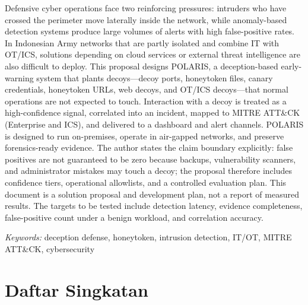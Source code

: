 \documentclass[12pt,a4paper]{article}
\begin{document}
Defensive cyber operations face two reinforcing pressures: intruders who have crossed the perimeter move laterally inside the network, while anomaly-based detection systems produce large volumes of alerts with high false-positive rates. In Indonesian Army networks that are partly isolated and combine IT with OT/ICS, solutions depending on cloud services or external threat intelligence are also difficult to deploy. This proposal designs POLARIS, a deception-based early-warning system that plants decoys---decoy ports, honeytoken files, canary credentials, honeytoken URLs, web decoys, and OT/ICS decoys---that normal operations are not expected to touch. Interaction with a decoy is treated as a high-confidence signal, correlated into an incident, mapped to MITRE ATT\&CK (Enterprise and ICS), and delivered to a dashboard and alert channels. POLARIS is designed to run on-premises, operate in air-gapped networks, and preserve forensics-ready evidence. The author states the claim boundary explicitly: false positives are not guaranteed to be zero because backups, vulnerability scanners, and administrator mistakes may touch a decoy; the proposal therefore includes confidence tiers, operational allowlists, and a controlled evaluation plan. This document is a solution proposal and development plan, not a report of measured results. The targets to be tested include detection latency, evidence completeness, false-positive count under a benign workload, and correlation accuracy.

\vspace{0.3cm}
\noindent\textit{Keywords:} deception defense, honeytoken, intrusion detection, IT/OT, MITRE ATT\&CK, cybersecurity

\newpage
\begingroup
\small
{}
\tableofcontents
\endgroup
\newpage

\section*{Daftar Singkatan}
\end{document}
